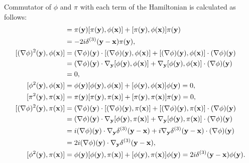 \documentclass[a4paper,11pt]{article}
\begin{document}
Commutator of $\phi$ and $\pi$ with each term of the Hamiltonian is calculated as follows:
\begin{align}
    [\pi^2(\mathbf{y}), \phi(\mathbf{x})] 
    &= \pi(\mathbf{y})[\pi(\mathbf{y}), \phi(\mathbf{x})] + [\pi(\mathbf{y}), \phi(\mathbf{x})]\pi(\mathbf{y}) \notag\\
    &=-2i\delta^{(3)}(\mathbf{y}-\mathbf{x})\pi(\mathbf{y}),\\
    [(\nabla\phi)^2(\mathbf{y}), \phi(\mathbf{x})] &=
    (\nabla\phi)(\mathbf{y})\cdot[(\nabla\phi)(\mathbf{y}), \phi(\mathbf{x})] + [(\nabla\phi)(\mathbf{y}), \phi(\mathbf{x})]\cdot(\nabla\phi)(\mathbf{y})\notag\\
    &=(\nabla\phi)(\mathbf{y})\cdot\nabla_{\mathbf{y}}[\phi(\mathbf{y}), \phi(\mathbf{x})] + \nabla_{\mathbf{y}}[\phi(\mathbf{y}), \phi(\mathbf{x})]\cdot(\nabla\phi)(\mathbf{y}) \notag\\
    &= 0,\\
    [\phi^2(\mathbf{y}), \phi(\mathbf{x})] &= \phi(\mathbf{y})[\phi(\mathbf{y}), \phi(\mathbf{x})] + [\phi(\mathbf{y}), \phi(\mathbf{x})]\phi(\mathbf{y}) = 0,\\
    [\pi^2(\mathbf{y}), \pi(\mathbf{x})] &= \pi(\mathbf{y})[\pi(\mathbf{y}), \pi(\mathbf{x})] + [\pi(\mathbf{y}), \pi(\mathbf{x})]\pi(\mathbf{y}) = 0,\\
    [(\nabla\phi)^2(\mathbf{y}), \pi(\mathbf{x})] &=
    (\nabla\phi)(\mathbf{y})\cdot[(\nabla\phi)(\mathbf{y}), \pi(\mathbf{x})] + [(\nabla\phi)(\mathbf{y}), \pi(\mathbf{x})]\cdot(\nabla\phi)(\mathbf{y})\notag\\
    &= (\nabla\phi)(\mathbf{y})\cdot\nabla_{\mathbf{y}}[\phi(\mathbf{y}), \pi(\mathbf{x})] + \nabla_{\mathbf{y}}[\phi(\mathbf{y}), \pi(\mathbf{x})]\cdot(\nabla\phi)(\mathbf{y})\notag\\
    &= i(\nabla\phi)(\mathbf{y})\cdot\nabla_{\mathbf{y}}\delta^{(3)}(\mathbf{y}-\mathbf{x}) + i\nabla_{\mathbf{y}}\delta^{(3)}(\mathbf{y}-\mathbf{x})\cdot(\nabla\phi)(\mathbf{y})\notag\\
    &= 2i(\nabla\phi)(\mathbf{y})\cdot\nabla_{\mathbf{y}}\delta^{(3)}(\mathbf{y}-\mathbf{x}),\\
    [\phi^2(\mathbf{y}), \pi(\mathbf{x})] &= \phi(\mathbf{y})[\phi(\mathbf{y}), \pi(\mathbf{x})] + [\phi(\mathbf{y}), \pi(\mathbf{x})]\phi(\mathbf{y}) = 2i\delta^{(3)}(\mathbf{y}-\mathbf{x})\phi(\mathbf{y}).
\end{align}
\end{document}
